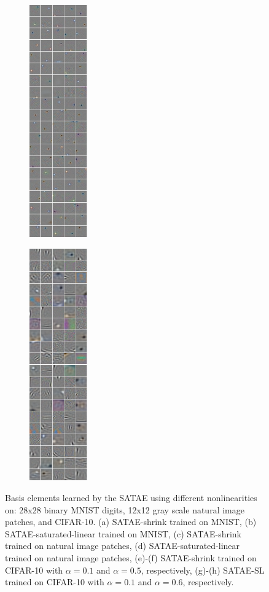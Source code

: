\documentclass{article} %
\begin{document}
\begin{figure}
\begin{subfigure}[b]{0.2\textwidth}
		\includegraphics[width=2.5cm, height=10cm]{.//CIFAR_sat_linear300_1.png}
		\caption{}
	\end{subfigure} 
	\begin{subfigure}[b]{0.2\textwidth}
		\centering 
		\includegraphics[width=2.5cm, height=10cm]{.//CIFAR_sat_linear300_6.png}
		\caption{}
	\end{subfigure} 
\caption{Basis elements learned by the SATAE using different nonlinearities on: 28x28 binary MNIST digits, 12x12 gray scale natural image patches, and CIFAR-10. (a) SATAE-shrink trained on MNIST, (b) SATAE-saturated-linear trained on MNIST, (c) SATAE-shrink trained on natural image patches, (d) SATAE-saturated-linear trained on natural image patches, (e)-(f) SATAE-shrink trained on CIFAR-10 with $\alpha=0.1$ and $\alpha=0.5$, respectively, (g)-(h) SATAE-SL trained on CIFAR-10 with $\alpha=0.1$ and $\alpha=0.6$, respectively.  }
\label{fig:results}
\end{figure} 
\end{document}
